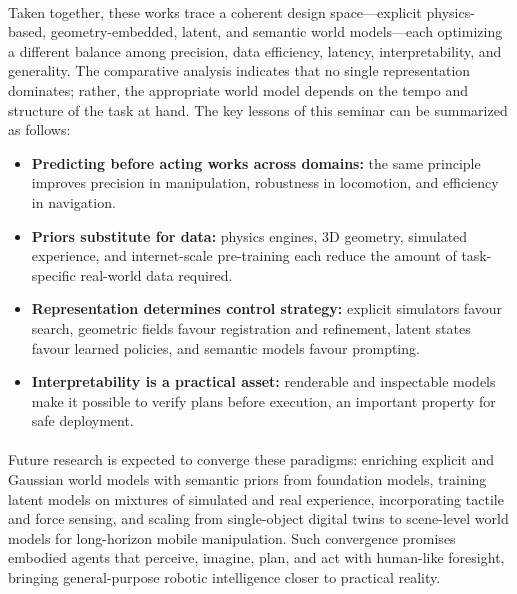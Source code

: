 \documentclass[12pt,a4paper,final]{extreport}
\begin{document}
\paragraph{}
Taken together, these works trace a coherent design space---explicit physics-based, geometry-embedded, latent, and semantic world models---each optimizing a different balance among precision, data efficiency, latency, interpretability, and generality. The comparative analysis indicates that no single representation dominates; rather, the appropriate world model depends on the tempo and structure of the task at hand. The key lessons of this seminar can be summarized as follows:
\begin{itemize}
  \item \textbf{Predicting before acting works across domains:} the same principle improves precision in manipulation, robustness in locomotion, and efficiency in navigation.
  \item \textbf{Priors substitute for data:} physics engines, 3D geometry, simulated experience, and internet-scale pre-training each reduce the amount of task-specific real-world data required.
  \item \textbf{Representation determines control strategy:} explicit simulators favour search, geometric fields favour registration and refinement, latent states favour learned policies, and semantic models favour prompting.
  \item \textbf{Interpretability is a practical asset:} renderable and inspectable models make it possible to verify plans before execution, an important property for safe deployment.
\end{itemize}

\paragraph{}
Future research is expected to converge these paradigms: enriching explicit and Gaussian world models with semantic priors from foundation models, training latent models on mixtures of simulated and real experience, incorporating tactile and force sensing, and scaling from single-object digital twins to scene-level world models for long-horizon mobile manipulation. Such convergence promises embodied agents that perceive, imagine, plan, and act with human-like foresight, bringing general-purpose robotic intelligence closer to practical reality.
\end{document}
